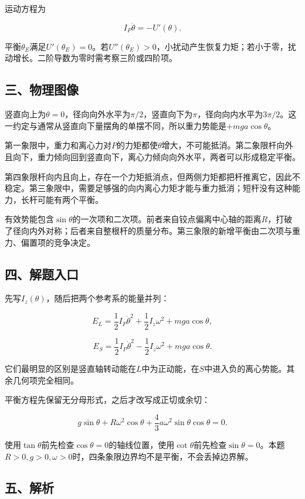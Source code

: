 \documentclass[12pt,a4paper,fontset=fandol]{ctexart}
\begin{document}
运动方程为

\[
I_P\ddot\theta=-U'(\theta).
\]

平衡\(\theta_E\)满足\(U'(\theta_E)=0\)。若\(U''(\theta_E)>0\)，小扰动产生恢复力矩；若小于零，扰动增长。二阶导数为零时需考察三阶或四阶项。

\subsection{三、物理图像}\label{ux4e09ux7269ux7406ux56feux50cf-3}

竖直向上为\(\theta=0\)，径向向外水平为\(\pi/2\)，竖直向下为\(\pi\)，径向向内水平为\(3\pi/2\)。这一约定与通常从竖直向下量摆角的单摆不同，所以重力势能是\(+mga\cos\theta\)。

第一象限中，重力和离心力对\(P\)的力矩都使\(\theta\)增大，不可能抵消。第二象限杆向外且向下，重力倾向回到竖直向下，离心力倾向向外水平，两者可以形成稳定平衡。

第四象限杆向内且向上，存在一个力矩抵消点，但两侧力矩都把杆推离它，因此不稳定。第三象限中，需要足够强的向内离心力矩才能与重力抵消；短杆没有这种能力，长杆可能有两个平衡。

有效势能包含\(\sin\theta\)的一次项和二次项。前者来自铰点偏离中心轴的距离\(R\)，打破了径向内外对称；后者来自整根杆的质量分布。第三象限的新增平衡由二次项与重力、偏置项的竞争决定。

\subsection{四、解题入口}\label{ux56dbux89e3ux9898ux5165ux53e3-3}

先写\(I_z(\theta)\)，随后把两个参考系的能量并列：

\[
E_L=\frac12I_P\dot\theta^2+\frac12I_z\omega^2+mga\cos\theta,
\]

\[
E_S=\frac12I_P\dot\theta^2-\frac12I_z\omega^2+mga\cos\theta.
\]

它们最明显的区别是竖直轴转动能在\(L\)中为正动能，在\(S\)中进入负的离心势能。其余几何项完全相同。

平衡方程先保留无分母形式，之后才改写成正切或余切：

\[
g\sin\theta+R\omega^2\cos\theta
+\frac43a\omega^2\sin\theta\cos\theta=0.
\]

使用\(\tan\theta\)前先检查\(\cos\theta=0\)的轴线位置，使用\(\cot\theta\)前先检查\(\sin\theta=0\)。本题\(R>0,g>0,\omega>0\)时，四条象限边界均不是平衡，不会丢掉边界解。

\subsection{五、解析}\label{ux4e94ux89e3ux6790-3}
\end{document}
